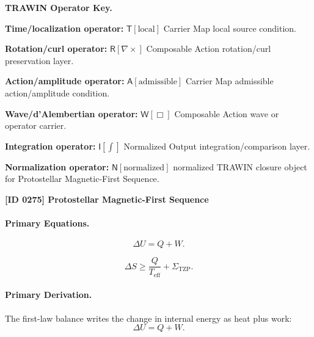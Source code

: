 \par\vspace{0.45\baselineskip}
\noindent\begin{minipage}[t]{\linewidth}
\begingroup
\small
\raggedright
\textbf{TRAWIN Operator Key.}\par
\noindent\textbf{Time/localization operator:} $\mathsf{T}\!\left[\mathrm{local}\right]$ Carrier Map local source condition.\par
\noindent\textbf{Rotation/curl operator:} $\mathsf{R}\!\left[\nabla\times\right]$ Composable Action rotation/curl preservation layer.\par
\noindent\textbf{Action/amplitude operator:} $\mathsf{A}\!\left[\mathrm{admissible}\right]$ Carrier Map admissible action/amplitude condition.\par
\noindent\textbf{Wave/d'Alembertian operator:} $\mathsf{W}\!\left[\Box\right]$ Composable Action wave or operator carrier.\par
\noindent\textbf{Integration operator:} $\mathsf{I}\!\left[\int\right]$ Normalized Output integration/comparison layer.\par
\noindent\textbf{Normalization operator:} $\mathsf{N}\!\left[\mathrm{normalized}\right]$ normalized TRAWIN closure object for Protostellar Magnetic-First Sequence.\par
\endgroup
\end{minipage}

\clearpage
\noindent\textbf{[ID 0275] Protostellar Magnetic-First Sequence}\par
\vspace{0.35em}
\paragraph{Primary Equations.}
\begin{equation}
\Delta U = Q+W .
\end{equation}

\begin{equation}
\Delta S
\geq
\frac{Q}{T_{\mathrm{eff}}}
+
\Sigma_{\mathrm{TZP}} .
\end{equation}

\paragraph{Primary Derivation.}
The first-law balance writes the change in internal energy as heat plus work:
\begin{equation}
\Delta U=Q+W .
\end{equation}

